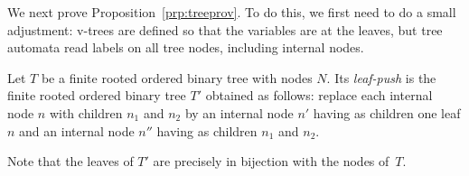 We next prove Proposition~\ref{prp:treeprov}. To do this, we first need to do a
small adjustment: v-trees are defined so that the variables are at the leaves,
but tree automata read labels on all tree nodes, including internal nodes.

\begin{definition}
  Let $T$ be a finite rooted ordered binary tree with nodes $N$. Its
  \emph{leaf-push}
  is the finite rooted ordered binary tree $T'$ obtained as follows: replace
  each internal node $n$ with children $n_1$ and $n_2$ by an internal node $n'$
  having as children one leaf $n$ and an internal node $n''$ having as children
  $n_1$ and $n_2$.

  Note that the leaves of $T'$ are precisely in bijection with the nodes of~$T$.
\end{definition}

